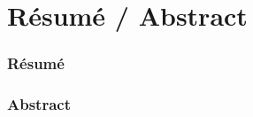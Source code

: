 
\chapter*{Résumé / Abstract}%
\pagestyle{plain}

\setlength{\headheight}{0.pt}
        


    
\subsection*{Résumé}











\begin{otherlanguage}{english}
%
\subsection*{Abstract}
\end{otherlanguage} 

